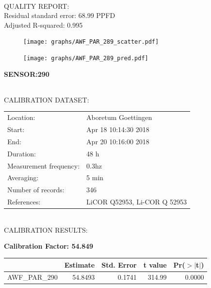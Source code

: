 \documentclass[oneside]{report}
\begin{document}
\hrulefill\\
QUALITY REPORT:\\
Residual standard error: 68.99 PPFD\\
Adjusted R-squared: 0.995



\begin{figure}[H]
  \centering
  \texttt{[image: graphs/AWF\_PAR\_289\_scatter.pdf]}
\end{figure}




\begin{figure}[H]
  \centering
  \texttt{[image: graphs/AWF\_PAR\_289\_pred.pdf]}
\end{figure}

\pagebreak


\begin{center}
\large{\textbf{SENSOR:290}}\\
\end{center}

\hrulefill\\
CALIBRATION DATASET:\\
\begin{table}[h!]
  \centering
  \label{tab:table1}
  \begin{tabular}{ll}
    Location: & Aboretum Goettingen\\ 
    
    
    Start:  & Apr 18 10:14:30 2018 \\
    End:   & Apr 20 10:16:00 2018\\ 
    Duration: & 48 h\\
    Measurement frequency: & 0.3hz\\
    Averaging:  &5 min\\
    Number of records: & 346 \\
    References: & LiCOR Q52953, Li-COR Q 52953 \\
  \end{tabular}
\end{table}

\hrulefill\\
CALIBRATION RESULTS:\\


\begin{center}
\textbf{\large{Calibration Factor: 54.849}}\\
\end{center}
\begin{table}[ht]
\centering
\begin{tabular}{rrrrr}
  \hline
 & Estimate & Std. Error & t value & Pr($>$$|$t$|$) \\ 
  \hline
AWF\_PAR\_290 & 54.8493 & 0.1741 & 314.99 & 0.0000 \\ 
   \hline
\end{tabular}
\end{table}
\end{document}
